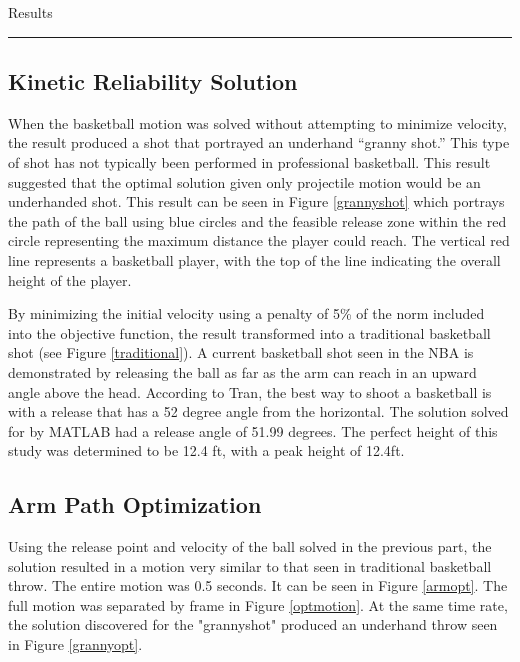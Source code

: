 
\begin{center}
\Large Results
\end{center}
\hrule

\begin{multicols}{2}
\subsection*{Kinetic Reliability Solution}
When the basketball motion was solved without attempting to minimize velocity, the result produced a shot that portrayed an underhand “granny shot.” This type of shot has not typically been performed in professional basketball. This result suggested that the optimal solution given only projectile motion would be an underhanded shot. This result can be seen in Figure \ref{grannyshot} which portrays the path of the ball using blue circles and the feasible release zone within the red circle representing the maximum distance the player could reach. The vertical red line represents a basketball player, with the top of the line indicating the overall height of the player.

By minimizing the initial velocity using a penalty of 5\% of the norm included into the objective function, the result transformed into a traditional basketball shot (see Figure \ref{traditional}). A current basketball shot seen in the NBA is demonstrated by releasing the ball as far as the arm can reach in an upward angle above the head. According to Tran, the best way to shoot a basketball is with a release that has a 52 degree angle from the horizontal. The solution solved for by  MATLAB had a release angle of 51.99 degrees. The perfect height of this study was determined to be 12.4 ft, with a peak height of 12.4ft.



\subsection*{Arm Path Optimization}
Using the release point and velocity of the ball solved in the previous part, the solution resulted in a motion very similar to that seen in traditional basketball throw. The entire motion was 0.5 seconds. It can be seen in Figure \ref{armopt}. The full motion was separated by frame in Figure \ref{optmotion}.  At the same time rate, the solution discovered for the "grannyshot" produced an underhand throw seen in Figure \ref{grannyopt}.


\end{multicols}
